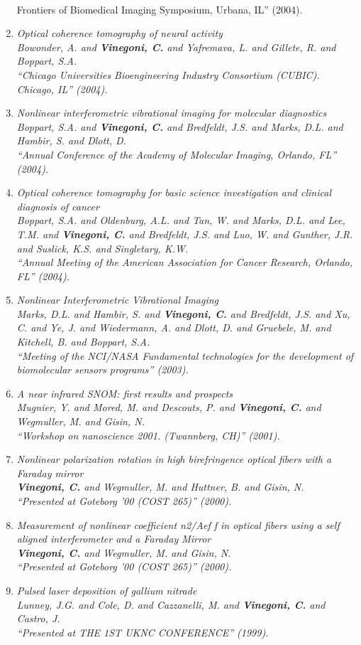 \documentclass{resume}
\begin{document}
\begin{category}{~~}
\begin{enumerate}
Frontiers of Biomedical Imaging Symposium, Urbana, IL''  (2004). \item \it Optical coherence tomography of neural activity \\ Bowonder, A. and {\bf Vinegoni, C.} and Yafremava, L. and Gillete, R. and Boppart, S.A. \\ ``Chicago Universities Bioengineering Industry Consortium (CUBIC). Chicago, IL''  (2004). \item \it Nonlinear interferometric vibrational imaging for molecular diagnostics \\ Boppart, S.A. and {\bf Vinegoni, C.} and Bredfeldt, J.S. and Marks, D.L. and Hambir, S. and Dlott, D. \\ ``Annual Conference of the Academy of Molecular Imaging, Orlando, FL''  (2004). \item \it Optical coherence tomography for basic science investigation and clinical diagnosis of cancer \\ Boppart, S.A. and Oldenburg, A.L. and Tan, W. and Marks, D.L. and Lee, T.M. and {\bf Vinegoni, C.} and Bredfeldt, J.S. and Luo, W. and Gunther, J.R. and Suslick, K.S. and Singletary, K.W. \\ ``Annual Meeting of the American Association for Cancer Research, Orlando, FL''  (2004). \item \it Nonlinear Interferometric Vibrational Imaging \\ Marks, D.L. and Hambir, S. and {\bf Vinegoni, C.} and Bredfeldt, J.S. and Xu, C. and Ye, J. and Wiedermann, A. and Dlott, D. and Gruebele, M. and Kitchell, B. and Boppart, S.A. \\ ``Meeting of the NCI/NASA Fundamental technologies for the development of biomolecular sensors programs''  (2003). \item \it A near infrared SNOM: first results and prospects \\ Mugnier, Y. and Mored, M. and Descouts, P. and {\bf Vinegoni, C.} and Wegmuller, M. and Gisin, N. \\ ``Workshop on nanoscience 2001. (Twannberg, CH)''  (2001). \item \it Nonlinear polarization rotation in high birefringence optical fibers with a Faraday mirror \\ {\bf Vinegoni, C.} and Wegmuller, M. and Huttner, B. and Gisin, N. \\ ``Presented at Goteborg ’00 (COST 265)''  (2000). \item \it Measurement of nonlinear coefficient n2/Aef f in optical fibers using a self aligned interferometer and a Faraday Mirror \\ {\bf Vinegoni, C.} and Wegmuller, M. and Gisin, N. \\ ``Presented at Goteborg ’00 (COST 265)''  (2000). \item \it Pulsed laser deposition of gallium nitrade \\ Lunney, J.G. and Cole, D. and Cazzanelli, M. and {\bf Vinegoni, C.} and Castro, J. \\ ``Presented at THE 1ST UKNC CONFERENCE''  (1999). 


\end{enumerate}
\end{category}
\end{document}
